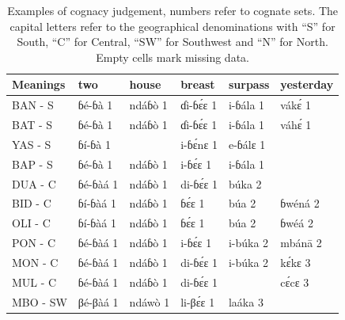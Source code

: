 \documentclass[output=paper,colorlinks,citecolor=brown
]{langscibook}
\begin{document}
\begin{table}
\caption{Examples of cognacy judgement, numbers refer to cognate sets. The capital letters refer to the geographical denominations with “S” for South, “C” for Central, “SW” for Southwest and “N” for North. Empty cells mark missing data.}
\label{tab:grollemundbrownrule:cognates}
 \begin{tabular}{llllll}
  \lsptoprule
          {{Meanings}} & {{two}} & {{house}} & {{breast}} & {{surpass}} & {{yesterday}} \\
  \midrule
  BAN - S                    & ɓé-ɓà 1             & ndáɓò 1                 & ɗi-ɓɛ́ɛ 1                & i-ɓála 1                 & vákɛ́ 1                    \\
BAT - S                    & ɓé-ɓà 1             & ndáɓò 1                 & ɗi-ɓɛ́ɛ 1                & i-ɓála 1                 & váhɛ́ 1                    \\
YAS - S                    & ɓí-ɓà 1             &                         & i-ɓɛ́nɛ 1                & e-ɓálɛ 1                 &                             \\
BAP - S                    & ɓé-ɓà 1             & ndáɓò 1                 & i-ɓɛ́ɛ 1                 & i-ɓála 1                 &                             \\
DUA - C                    & ɓé-ɓàá 1           & ndáɓò 1                 & di-ɓɛ́ɛ 1                & búka 2                   &                             \\
BID - C                    & ɓí-ɓàá 1           & ndáɓò 1                 & ɓɛ́ɛ 1                   & búa 2                    & ɓwéná 2                   \\
OLI - C                    & ɓí-ɓàá 1           & ndáɓò 1                 & ɓɛ́ɛ 1                   & búa 2                    & ɓwéá 2                    \\
PON - C                    & ɓé-ɓàá 1           & ndáɓò 1                 & i-ɓɛ́ɛ 1                 & i-búka 2                 & mbánā 2                   \\
MON - C                    & ɓé-ɓàá 1           & ndáɓò 1                 & di-ɓɛ́ɛ 1                & i-búka 2                 & kɛ́kɛ 3                     \\
MUL - C                    & ɓé-ɓàá 1           & ndáɓò 1                 & di-ɓɛ́ɛ 1                &                           & cɛ́cɛ 3                     \\
MBO - SW                   & βé-βàá 1           & ndáwò 1                 & li-βɛ́ɛ 1                & laáka 3                  &                             \\

\end{tabular}
\end{table}
\end{document}
